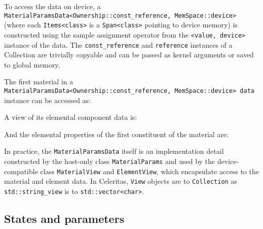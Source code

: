 To access the data on device, a
\texttt{MaterialParamsData\textless{}Ownership::const\_reference,\ MemSpace::device\textgreater{}}
(where each \texttt{Items\textless{}class\textgreater{}} is a
\texttt{Span\textless{}class\textgreater{}} pointing to device memory)
is constructed using the sample assignment operator from the
\texttt{\textless{}value,\ device\textgreater{}} instance of the data.
The \texttt{const\_reference} and \texttt{reference} instances of a
Collection are trivially copyable and can be passed as kernel arguments
or saved to global memory.

The first material in a
\texttt{MaterialParamsData\textless{}Ownership::const\_reference,\ MemSpace::device\textgreater{}\ data}
instance can be accessed as:
\begin{Shaded}
\begin{Highlighting}[]
\NormalTok{ Material\& m = data.materials[ItemId\textless{}Material\textgreater{}(}\NormalTok{)];}
\end{Highlighting}
\end{Shaded}
%
A view of its elemental component data is:
%
\begin{Shaded}
\begin{Highlighting}[]
\end{Highlighting}
\end{Shaded}
%
And the elemental properties of the first constituent of the material
are:
%
\begin{Shaded}
\begin{Highlighting}[]
\end{Highlighting}
\end{Shaded}

In practice, the \texttt{MaterialParamsData} itself is an implementation
detail constructed by the host-only class \texttt{MaterialParams} and
used by the device-compatible class \texttt{MaterialView} and
\texttt{ElementView}, which encapsulate access to the material and
element data. In Celeritas, \texttt{View} objects are to
\texttt{Collection} as \texttt{std::string\_view} is to
\texttt{std::vector\textless{}char\textgreater{}}.

\hypertarget{states-and-parameters}{%
\subsection{States and parameters}\label{states-and-parameters}}

